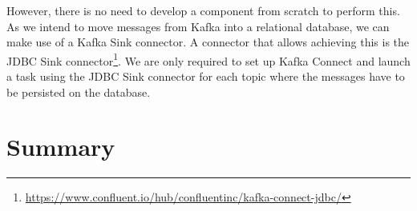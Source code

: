 However, there is no need to develop a component from scratch to perform this.
As we intend to move messages from Kafka into a relational database, we can make use of a Kafka Sink connector.
A connector that allows achieving this is the JDBC Sink connector\footnote{\url{https://www.confluent.io/hub/confluentinc/kafka-connect-jdbc/}}.
We are only required to set up Kafka Connect and launch a task using the JDBC Sink connector for each topic where the messages have to be persisted on the database.

\section{Summary}
